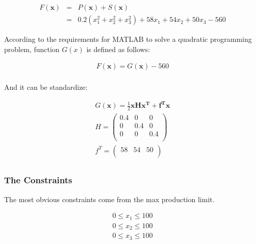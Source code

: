 \documentclass[12pt]{article}
\begin{document}
\begin{equation}
\begin{aligned}
	F(\mathbf{x}) &=& P(\mathbf{x})+S(\mathbf{x}) \\ 
	&=& 0.2(x_1^2+x_2^2+x_3^2)+58x_1+54x_2+50x_3-560
\end{aligned}
\end{equation}

According to the requirements for MATLAB to solve a quadratic programming problem, function $G(x)$ is defined as follows:

\begin{equation}
\begin{aligned}
	F(\mathbf{x})=G(\mathbf{x})-560  \\
\end{aligned}
\end{equation}

And it can be standardize:

\begin{equation}
\begin{aligned}
		G(\mathbf{x})=\frac{1}{2}\mathbf{x}\mathbf{H}\mathbf{x^T}+ \mathbf{f^T}\mathbf{x} \\
	H=\left(   
	\begin{array}{ccc} 
		0.4 & 0 & 0\\
		0 & 0.4 & 0\\ 
		0 & 0 & 0.4\\ 
	\end{array}
	\right) \\
	f^T=\left(   
	\begin{array}{ccc} 
		58 & 54 & 50\\
	\end{array}
	\right) \\
\end{aligned}
\end{equation}

\subsubsection{The Constraints}

The most obvious constraints come from the max production limit.

\begin{equation}
	\begin{aligned}
	0 \le x_1 \le 100 \\
	0 \le x_2 \le 100 \\
	0 \le x_3 \le 100 \\
	\end{aligned}
\end{equation}
\end{document}
